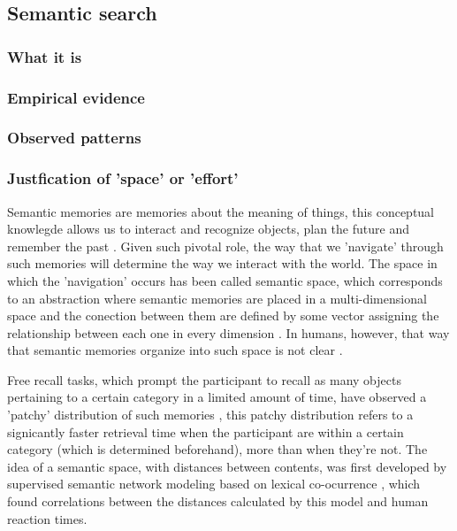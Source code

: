 \documentclass[11pt]{article}
\begin{document}
\subsection{Semantic search}
\label{sec:org5a7db3e}
\subsubsection{What it is}
\label{sec:org2341ec4}
\subsubsection{Empirical evidence}
\label{sec:orgc235d9e}
\subsubsection{Observed patterns}
\label{sec:org2ee09c3}
\subsubsection{Justfication of 'space' or 'effort'}
\label{sec:orge7a6878}
Semantic memories are memories about the meaning of things, this conceptual
knowlegde allows us to interact and recognize objects, plan the future and
remember the past \citep{binderNeurobiologySemanticMemory2011}. Given such pivotal
role, the way that we 'navigate' through such memories will determine the way we
interact with the world. The space in which the 'navigation' occurs has been
called semantic space, which corresponds to an abstraction where semantic
memories are placed in a multi-dimensional space and the conection between them
are defined by some vector assigning the relationship between each one in every
dimension \citep{lundProducingHighdimensionalSemantic1996a}. In humans, however,
that way that semantic memories organize into such space is not clear
\citep{benedekHowSemanticMemory2017}.  

Free recall tasks, which prompt the participant to recall as many objects
pertaining to a certain category in a limited amount of time, have observed a
'patchy' distribution of such memories \citep{hillsOptimalForagingSemantic2009},
this patchy distribution refers to a signicantly faster retrieval time when the
participant are within a certain category (which is determined beforehand), more
than when they're not. The idea of a semantic space, with distances between contents, was
first developed by supervised semantic network modeling based on lexical
co-ocurrence \citep{lundProducingHighdimensionalSemantic1996a}, which found
correlations between the distances calculated by this model and human reaction
times.
\end{document}

